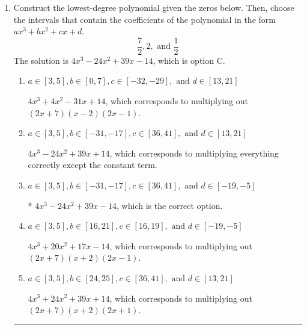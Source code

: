 \documentclass{extbook}[14pt]
\newcommand{\litem}[1]{\item #1

\rule{\textwidth}{0.4pt}}
\begin{document}
\begin{enumerate}\litem{
Construct the lowest-degree polynomial given the zeros below. Then, choose the intervals that contain the coefficients of the polynomial in the form $ax^3+bx^2+cx+d$.
\[ \frac{7}{2}, 2, \text{ and } \frac{1}{2} \]The solution is \( 4x^{3} -24 x^{2} +39 x -14 \), which is option C.\begin{enumerate}[label=\Alph*.]
\item \( a \in [3, 5], b \in [0, 7], c \in [-32, -29], \text{ and } d \in [13, 21] \)

$4x^{3} +4 x^{2} -31 x + 14$, which corresponds to multiplying out $(2x + 7)(x -2)(2x -1)$.
\item \( a \in [3, 5], b \in [-31, -17], c \in [36, 41], \text{ and } d \in [13, 21] \)

$4x^{3} -24 x^{2} +39 x + 14$, which corresponds to multiplying everything correctly except the constant term.
\item \( a \in [3, 5], b \in [-31, -17], c \in [36, 41], \text{ and } d \in [-19, -5] \)

* $4x^{3} -24 x^{2} +39 x -14$, which is the correct option.
\item \( a \in [3, 5], b \in [16, 21], c \in [16, 19], \text{ and } d \in [-19, -5] \)

$4x^{3} +20 x^{2} +17 x -14$, which corresponds to multiplying out $(2x + 7)(x + 2)(2x -1)$.
\item \( a \in [3, 5], b \in [24, 25], c \in [36, 41], \text{ and } d \in [13, 21] \)

$4x^{3} +24 x^{2} +39 x + 14$, which corresponds to multiplying out $(2x + 7)(x + 2)(2x + 1)$.
\end{enumerate}

}
\end{enumerate}
\end{document}
